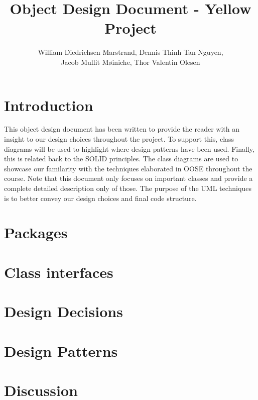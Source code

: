 \documentclass{article}
\title{Object Design Document - Yellow Project}
\author{William Diedrichsen Marstrand, Dennis Thinh Tan Nguyen, 
\\Jacob Mullit Møiniche, Thor Valentin Olesen}
\begin{document}
\maketitle
\newpage
\tableofcontents
\newpage

\section{Introduction}

This object design document has been written to provide the reader with an insight to our design choices throughout the project. To support this, class diagrams will be used to highlight where design patterns have been used. Finally, this is related back to the SOLID principles. The class diagrams are used to showcase our familarity with the techniques elaborated in OOSE throughout the course. Note that this document only focuses on important classes and provide a complete detailed description only of those. The purpose of the UML techniques is to better convey our design choices and final code structure. 

	
	
	
	 
\section{Packages}
	
	
	
	
\section{Class interfaces}
	
	
	
	
	
\section{Design Decisions}
	
	
	
\section{Design Patterns}
	
	
	
	
	
	
\section{Discussion} %
\end{document}
